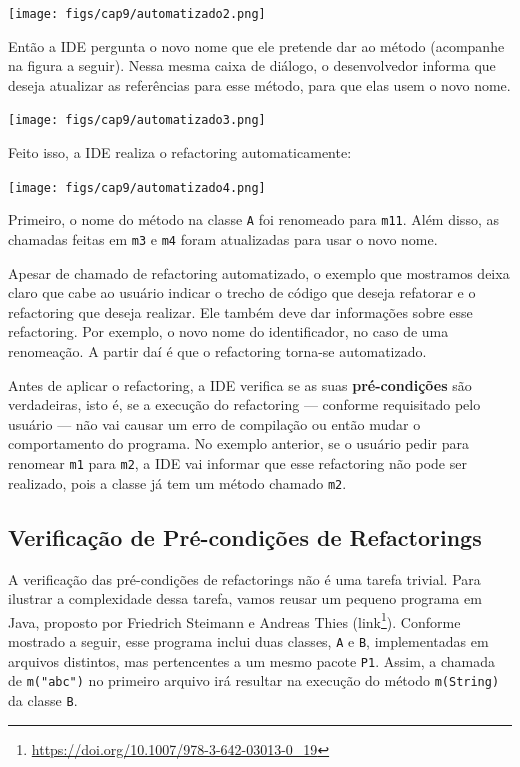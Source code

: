 \documentclass[
  11pt,
  twoside]{book}
\newcommand{\passthrough}[1]{#1}
\DeclareRobustCommand{\href}[2]{#2\footnote{\url{#1}}}
\begin{document}
\texttt{[image: figs/cap9/automatizado2.png]}

Então a IDE pergunta o novo nome que ele pretende dar ao método
(acompanhe na figura a seguir). Nessa mesma caixa de diálogo, o
desenvolvedor informa que deseja atualizar as referências para esse
método, para que elas usem o novo nome.

\texttt{[image: figs/cap9/automatizado3.png]}

Feito isso, a IDE realiza o refactoring automaticamente:

\texttt{[image: figs/cap9/automatizado4.png]}

Primeiro, o nome do método na classe \passthrough{\lstinline!A!} foi
renomeado para \passthrough{\lstinline!m11!}. Além disso, as chamadas
feitas em \passthrough{\lstinline!m3!} e \passthrough{\lstinline!m4!}
foram atualizadas para usar o novo nome.

Apesar de chamado de refactoring automatizado, o exemplo que mostramos
deixa claro que cabe ao usuário indicar o trecho de código que deseja
refatorar e o refactoring que deseja realizar. Ele também deve dar
informações sobre esse refactoring. Por exemplo, o novo nome do
identificador, no caso de uma renomeação. A partir daí é que o
refactoring torna-se automatizado.

 Antes de aplicar o refactoring, a IDE
verifica se as suas \textbf{pré-condições} são verdadeiras, isto é, se a
execução do refactoring --- conforme requisitado pelo usuário --- não
vai causar um erro de compilação ou então mudar o comportamento do
programa. No exemplo anterior, se o usuário pedir para renomear
\passthrough{\lstinline!m1!} para \passthrough{\lstinline!m2!}, a IDE
vai informar que esse refactoring não pode ser realizado, pois a classe
já tem um método chamado \passthrough{\lstinline!m2!}.

\hypertarget{verificauxe7uxe3o-de-pruxe9-condiuxe7uxf5es-de-refactorings}{%
\subsection{Verificação de Pré-condições de
Refactorings}\label{verificauxe7uxe3o-de-pruxe9-condiuxe7uxf5es-de-refactorings}}

A verificação das pré-condições de refactorings não é uma tarefa
trivial. Para ilustrar a complexidade dessa tarefa, vamos reusar um
pequeno programa em Java, proposto por Friedrich Steimann e Andreas
Thies (\href{https://doi.org/10.1007/978-3-642-03013-0_19}{link}).
Conforme mostrado a seguir, esse programa inclui duas classes,
\passthrough{\lstinline!A!} e \passthrough{\lstinline!B!}, implementadas
em arquivos distintos, mas pertencentes a um mesmo pacote
\passthrough{\lstinline!P1!}. Assim, a chamada de
\passthrough{\lstinline!m("abc")!} no primeiro arquivo irá resultar na
execução do método \passthrough{\lstinline!m(String)!} da classe
\passthrough{\lstinline!B!}.
\end{document}
